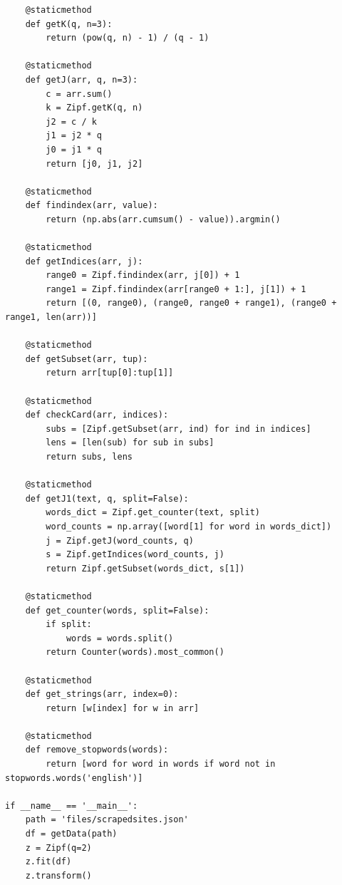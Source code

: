 \documentclass[12pt]{article}
\begin{document}
\begin{appendices}
\begin{verbatim}
    @staticmethod
    def getK(q, n=3):
        return (pow(q, n) - 1) / (q - 1)
        
    @staticmethod
    def getJ(arr, q, n=3):
        c = arr.sum()
        k = Zipf.getK(q, n)
        j2 = c / k
        j1 = j2 * q
        j0 = j1 * q
        return [j0, j1, j2]
        
    @staticmethod
    def findindex(arr, value):
        return (np.abs(arr.cumsum() - value)).argmin()
        
    @staticmethod
    def getIndices(arr, j):
        range0 = Zipf.findindex(arr, j[0]) + 1
        range1 = Zipf.findindex(arr[range0 + 1:], j[1]) + 1
        return [(0, range0), (range0, range0 + range1), (range0 + range1, len(arr))]
        
    @staticmethod
    def getSubset(arr, tup):
        return arr[tup[0]:tup[1]]
        
    @staticmethod
    def checkCard(arr, indices):
        subs = [Zipf.getSubset(arr, ind) for ind in indices]
        lens = [len(sub) for sub in subs]
        return subs, lens

    @staticmethod
    def getJ1(text, q, split=False):
        words_dict = Zipf.get_counter(text, split)
        word_counts = np.array([word[1] for word in words_dict])
        j = Zipf.getJ(word_counts, q)
        s = Zipf.getIndices(word_counts, j)
        return Zipf.getSubset(words_dict, s[1])

    @staticmethod
    def get_counter(words, split=False):
        if split:
            words = words.split()
        return Counter(words).most_common()

    @staticmethod
    def get_strings(arr, index=0):
        return [w[index] for w in arr]

    @staticmethod
    def remove_stopwords(words):
        return [word for word in words if word not in stopwords.words('english')]

if __name__ == '__main__':
    path = 'files/scrapedsites.json'
    df = getData(path)
    z = Zipf(q=2)
    z.fit(df)
    z.transform()
\end{verbatim}
\end{appendices}

\newpage
\printbibliography
\end{document}

